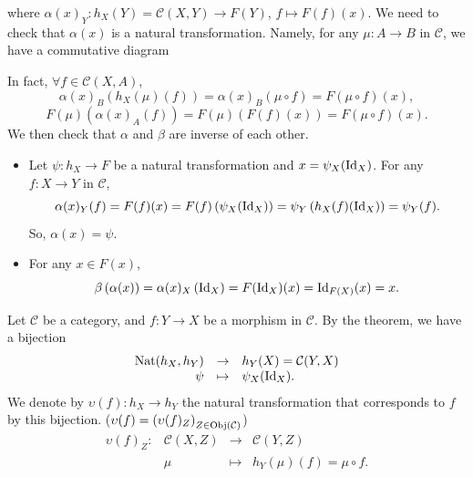\begin{proofenv}
\begin{figure}[H]
\begin{tikzpicture}[x=0.75pt,y=0.75pt,yscale=-1,xscale=1, scale = 0.8]
\end{tikzpicture}
\end{figure}
    where $\alpha(x)_{Y}:h_X(Y)=\mathcal{C}(X,Y)\rightarrow F(Y)$, $f\mapsto F(f)(x)$. We need to check that $\alpha(x)$ is a natural transformation.
    Namely, for any $ \mu:A\rightarrow B$ in $\mathcal{C}$, we have a commutative diagram
    \begin{center}
\end{center}
In fact, 
$\forall f\in \mathcal{C}(X,A)$, $$\alpha(x)_B(h_X(\mu)(f))=\alpha(x)_B(\mu\circ f)=F(\mu\circ f)(x),$$
$$F(\mu)\left(\alpha(x)_A(f)\right) = F(\mu)\left(F(f)(x)\right)=F(\mu\circ f)(x).$$
We then check that $\alpha$ and $\beta$ are inverse of each other.
\begin{itemize}
    \item Let $\psi:h_X\rightarrow F$ be a natural transformation and $x=\psi_X(\operatorname{\mathrm{Id}}_X)$. For any $f:X\rightarrow Y$ in $\mathcal{C}$,
    $$\alpha(x)_{Y}(f) = F(f)(x) = F(f)\left(\psi_X(\operatorname{\mathrm{Id}}_X)\right)=\psi_Y\left(h_X(f)(\operatorname{\mathrm{Id}}_X)\right)=\psi_Y(f).$$
    So, $\alpha(x)=\psi$.
    \item For any $x\in F(x)$,
    $$ \beta\left(\alpha(x)\right)=\alpha(x)_X\left(\operatorname{\mathrm{Id}}_X\right)= F(\operatorname{\mathrm{Id}}_X)(x) = \operatorname{\mathrm{Id}}_{F(X)}(x)=x.$$
\end{itemize}
    \begin{center}
\end{center}
\end{proofenv}
\begin{notationenv}
    Let $\mathcal{C}$ be a category, and $f:Y\rightarrow X$ be a morphism in $\mathcal{C}$. By the theorem, we have a bijection
    $$\begin{array}{rcl}
        \mathrm{Nat}(h_X,h_Y)&\rightarrow &h_Y(X)=\mathcal{C}(Y,X)\\
        \psi&\mapsto&\psi_X(\operatorname{\mathrm{Id}}_X).
    \end{array}$$
    We denote by $\upsilon(f):h_X\rightarrow h_Y$ the natural transformation that corresponds to $f$ by this bijection. ($\upsilon(f)= \left(\upsilon(f)_Z\right)_{Z\in \operatorname{\mathrm{Obj}}(\mathcal{C})}$)
    $$ \begin{array}{rrcl}
        \upsilon(f)_{Z} :& \mathcal{C}(X,Z)&\rightarrow&\mathcal{C}(Y,Z)\\
        &\mu&\mapsto& h_Y(\mu)(f)=\mu\circ f.
    \end{array}
    $$
\end{notationenv}
